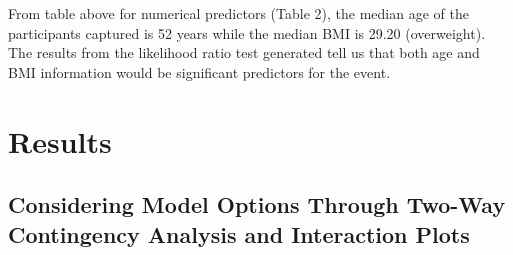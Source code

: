 \documentclass[12pt]{article}
\begin{document}
\begin{table}[!ht]
\caption{Descriptive statistics numerical predictors}
\centering
\small
{}
\end{table}

From table above for numerical predictors (Table 2), the median age of the participants captured is 52 years while the median BMI is 29.20 (overweight). The results from the likelihood ratio test generated tell us that both age and BMI information would be significant predictors for the event.    


\section*{Results}

\subsection*{Considering Model Options Through Two-Way Contingency Analysis and Interaction Plots}
\end{document}
